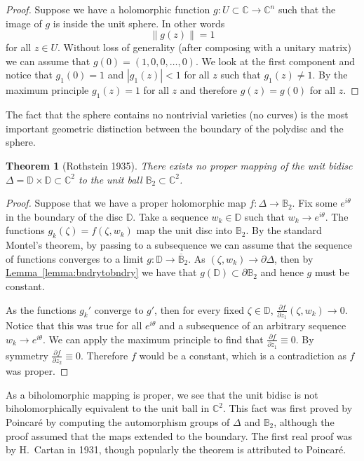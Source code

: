 \documentclass[12pt,openany]{book}
\newcommand{\abs}[1]{\left\lvert {#1} \right\rvert}
\newcommand{\norm}[1]{\left\lVert {#1} \right\rVert}
\newcommand{\C}{{\mathbb{C}}}
\newcommand{\bB}{{\mathbb{B}}}
\newcommand{\bD}{{\mathbb{D}}}
\theoremstyle{plain}
\newtheorem{thm}{Theorem}[section]
\theoremstyle{remark}
\theoremstyle{definition}
\theoremstyle{exercise}
\theoremstyle{example}
\newcommand{\lemmaref}[1]{\hyperref[#1]{Lemma~\ref*{#1}}}
\begin{document}
\begin{proof}
Suppose we have a holomorphic function $g \colon U \subset \C \to \C^n$
such that the image of $g$ is inside the unit sphere.  In other words
\begin{equation}
\norm{g(z)} = 1
\end{equation}
for all $z \in U$.  Without loss of generality (after composing with a
unitary matrix) we can assume that
$g(0) = (1,0,0,\ldots,0)$.  We look at the first component
and notice that $g_1(0) = 1$ and $\abs{g_1(z)} < 1$ for all $z$
such that $g_1(z) \not= 1$.  By the maximum principle $g_1(z) = 1$
for all $z$ and therefore $g(z) = g(0)$ for all $z$.
\end{proof}

The fact that the sphere contains no nontrivial varieties (no curves)
is the most important geometric distinction between the boundary of
the polydisc and the sphere.

\begin{thm}[Rothstein 1935]
There exists no proper mapping of the unit bidisc $\Delta = \bD \times \bD
\subset \C^2$ to the unit ball $\bB_2 \subset \C^2$.
\end{thm}

\begin{proof}
Suppose that we have a proper holomorphic map $f \colon \Delta
\to \bB_2$.
Fix some $e^{i\theta}$ in the boundary of the disc $\bD$.  Take a sequence
$w_k \in \bD$ such that $w_k \to e^{i\theta}$.   The functions
$g_k(\zeta) =  f(\zeta,w_k)$ map the unit disc into $\bB_2$.  By the standard
Montel's theorem, by passing to a subsequence we can assume that
the sequence of functions converges to
a limit $g \colon \bD \to \overline{\bB}_2$.  As $(\zeta,w_k) \to \partial
\Delta$, then by
\lemmaref{lemma:bndrytobndry} we have that $g(\bD) \subset \partial \bB_2$
and hence $g$ must be constant.

As the functions $g_k'$ converge 
to $g'$, then for every fixed $\zeta \in \bD$,
$\frac{\partial f}{\partial z_1} (\zeta, w_k) \to 0$.
Notice that this was true for all $e^{i\theta}$ and a subsequence of
an arbitrary sequence $w_k \to e^{i\theta}$.  We can apply the maximum
principle to find that
$\frac{\partial f}{\partial z_1} \equiv 0$.  By symmetry
$\frac{\partial f}{\partial z_2} \equiv 0$.  Therefore $f$ would be a
constant, which is a contradiction as $f$ was proper.
\end{proof}

As a biholomorphic mapping is proper,
we see that the unit bidisc is not biholomorphically
equivalent to the unit ball in $\C^2$.  This fact was first proved by
Poincar\'e by computing the automorphism groups of $\Delta$ and $\bB_2$,
although the proof
assumed that the maps extended to the boundary.  The first
real proof was by H.\ Cartan in 1931, though popularly the theorem is
attributed to Poincar\'e.
\end{document}
